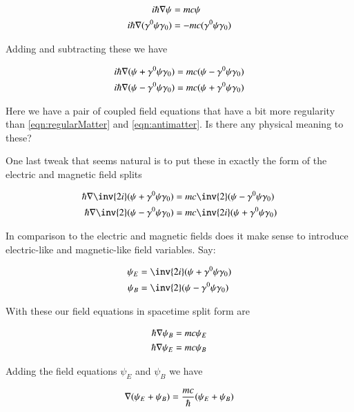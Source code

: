 \documentclass{article}
\begin{document}
\begin{align*}
i \hbar \nabla \psi &= m c \psi \\
i \hbar \nabla (\gamma^0 \psi \gamma_0) &= -m c (\gamma^0 \psi \gamma_0)
\end{align*}

Adding and subtracting these we have

\begin{align*}
i \hbar \nabla (\psi + \gamma^0 \psi \gamma_0) &= m c (\psi -\gamma^0 \psi \gamma_0) \\
i \hbar \nabla (\psi - \gamma^0 \psi \gamma_0) &= m c (\psi +\gamma^0 \psi \gamma_0)
\end{align*}

Here we have a pair of coupled field equations that have a bit more regularity than 
\ref{eqn:regularMatter} and \ref{eqn:antimatter}.  Is there any physical meaning to these?

One last tweak that seems natural is to put these in exactly the form of the electric and magnetic field splits

\begin{align*}
\hbar \grad \inv{2i} (\psi + \gamma^0 \psi \gamma_0) &= m c \inv{2} (\psi -\gamma^0 \psi \gamma_0) \\
\hbar \grad \inv{2} (\psi - \gamma^0 \psi \gamma_0) &= m c \inv{2i} (\psi +\gamma^0 \psi \gamma_0)
\end{align*}

In comparison to the electric and magnetic fields does it make sense to introduce electric-like and magnetic-like field variables.  Say:

\begin{align*}
\psi_E &= \inv{2i} (\psi + \gamma^0 \psi \gamma_0) \\
\psi_B &= \inv{2} (\psi - \gamma^0 \psi \gamma_0)
\end{align*}

With these our field equations in spacetime split form are

\begin{align*}
\hbar \nabla \psi_B &= m c \psi_E \\
\hbar \nabla \psi_E &= m c \psi_B \\
\end{align*}

Adding the field equations $\psi_E$ and $\psi_B$ we have

\begin{align*}
\nabla (\psi_E + \psi_B) &= \frac{m c}{\hbar} (\psi_E + \psi_B) \\ 
\end{align*}
\end{document}
